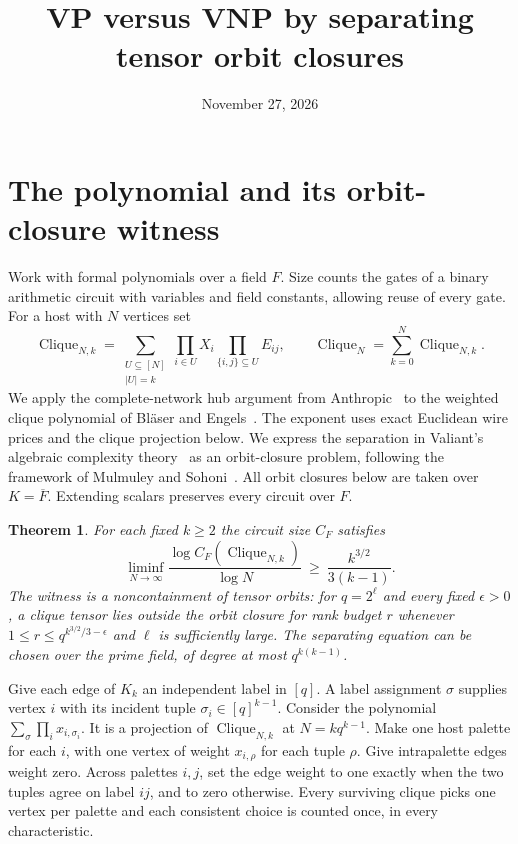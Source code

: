 \documentclass[11pt,letterpaper]{article}
\title{VP versus VNP by separating tensor orbit closures}
\author{}\date{November 27, 2026}
\newtheorem{theorem}{Theorem}
\newcommand{\Cl}{\operatorname{Clique}}
\begin{document}
\maketitle

\section{The polynomial and its orbit-closure witness}
Work with formal polynomials over a field $F$. Size counts the gates of
a binary arithmetic circuit with variables and field constants, allowing
reuse of every gate. For a host with $N$ vertices set
\[
 \Cl_{N,k}=\sum_{\substack{U\subseteq[N]\\|U|=k}}
      \prod_{i\in U}X_i\prod_{\{i,j\}\subseteq U}E_{ij},
 \qquad \Cl_N=\sum_{k=0}^N\Cl_{N,k}.
\]
We apply the complete-network hub argument from Anthropic~\cite[Lemma~E.4 and Proposition~E.5]{anthropic} to the weighted clique polynomial of Bl\"aser and Engels~\cite[Example~4.4]{be}. The exponent uses exact Euclidean wire prices and the clique projection below.
We express the separation in Valiant's algebraic complexity theory~\cite{valiant-completeness} as an orbit-closure problem, following the framework of Mulmuley and Sohoni~\cite{mulmuley-sohoni-gct}.
All orbit closures below are taken over $K=\overline F$. Extending scalars preserves every circuit over $F$.

\begin{theorem}\label{main}
For each fixed $k\ge2$ the circuit size $C_F$ satisfies
\[
 \liminf_{N\to\infty}\frac{\log C_F(\Cl_{N,k})}{\log N}
                  \ \ge\ \frac{k^{3/2}}{3(k-1)} .
\]
The witness is a noncontainment of tensor orbits: for $q=2^\ell$ and
every fixed $\epsilon>0$, a clique tensor lies outside the orbit closure
for rank budget $r$ whenever $1\le r\le q^{k^{3/2}/3-\epsilon}$ and
$\ell$ is sufficiently large. The separating equation can be chosen
over the prime field, of degree at most $q^{k(k-1)}$.
\end{theorem}

Give each edge of $K_k$ an independent label in $[q]$. A label assignment
$\sigma$ supplies vertex $i$ with its incident tuple $\sigma_i\in[q]^{k-1}$.
Consider the polynomial $\sum_\sigma\prod_i x_{i,\sigma_i}$.
It is a projection of $\Cl_{N,k}$ at $N=kq^{k-1}$. Make one host palette
for each $i$, with one vertex of weight $x_{i,\rho}$ for each tuple $\rho$.
Give intrapalette edges weight zero. Across palettes $i,j$, set the edge
weight to one exactly when the two tuples agree on label $ij$, and to
zero otherwise. Every surviving clique picks one vertex per palette and
each consistent choice is counted once, in every characteristic.
\end{document}
